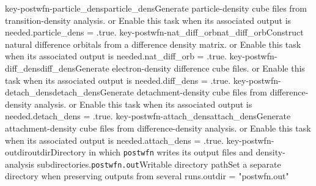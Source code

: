 \keyword
{key-postwfn-particle_dens}{particle\_dens}{Generate particle-density cube files from transition-density analysis.}{\OpOptional}{\OpLogic}{\OpFalse}{\OpTrue{} or \OpFalse}{Enable this task when its associated output is needed.}{particle\_dens = .true.}
\keyword
{key-postwfn-nat_diff_orb}{nat\_diff\_orb}{Construct natural difference orbitals from a difference density matrix.}{\OpOptional}{\OpLogic}{\OpFalse}{\OpTrue{} or \OpFalse}{Enable this task when its associated output is needed.}{nat\_diff\_orb = .true.}
\keyword
{key-postwfn-diff_dens}{diff\_dens}{Generate electron-density difference cube files.}{\OpOptional}{\OpLogic}{\OpFalse}{\OpTrue{} or \OpFalse}{Enable this task when its associated output is needed.}{diff\_dens = .true.}
\keyword
{key-postwfn-detach_dens}{detach\_dens}{Generate detachment-density cube files from difference-density analysis.}{\OpOptional}{\OpLogic}{\OpFalse}{\OpTrue{} or \OpFalse}{Enable this task when its associated output is needed.}{detach\_dens = .true.}
\keyword
{key-postwfn-attach_dens}{attach\_dens}{Generate attachment-density cube files from difference-density analysis.}{\OpOptional}{\OpLogic}{\OpFalse}{\OpTrue{} or \OpFalse}{Enable this task when its associated output is needed.}{attach\_dens = .true.}
\keyword
{key-postwfn-outdir}{outdir}{Directory in which \texttt{postwfn} writes its output files and density-analysis subdirectories.}{\OpOptional}{\OpString}{\texttt{postwfn.out}}{Writable directory path}{Set a separate directory when preserving outputs from several runs.}{outdir = "postwfn.out"}
